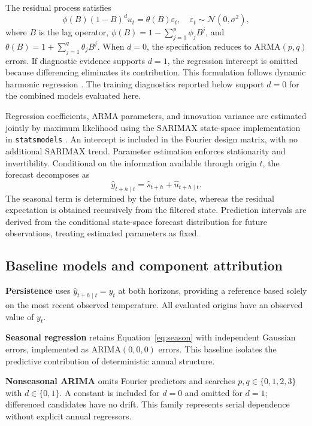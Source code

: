 \documentclass{article}
\begin{document}
The residual process satisfies
\begin{equation}
\phi(B)(1-B)^d u_t=\theta(B)\varepsilon_t,
\quad \varepsilon_t\sim\mathcal{N}(0,\sigma^2),
\end{equation}
where $B$ is the lag operator,
$\phi(B)=1-\sum_{j=1}^{p}\phi_jB^j$, and
$\theta(B)=1+\sum_{j=1}^{q}\theta_jB^j$.
When $d=0$, the specification reduces to ARMA$(p,q)$ errors. If diagnostic
evidence supports $d=1$, the regression intercept is omitted because
differencing eliminates its contribution. This formulation follows dynamic
harmonic regression \cite{hyndman2021}. The training diagnostics reported below
support $d=0$ for the combined models evaluated here.

Regression coefficients, ARMA parameters, and innovation variance are estimated
jointly by maximum likelihood using the SARIMAX state-space implementation
in \texttt{statsmodels} \cite{statsmodels}. An intercept is included in the
Fourier design matrix, with no additional SARIMAX trend. Parameter estimation
enforces stationarity and invertibility. Conditional on the information
available through origin $t$, the forecast decomposes as
\begin{equation}
\widehat y_{t+h\mid t}=\widehat s_{t+h}+\widehat u_{t+h\mid t}.
\end{equation}
The seasonal term is determined by the future date, whereas the residual
expectation is obtained recursively from the filtered state. Prediction
intervals are derived from the conditional state-space forecast distribution
for future observations, treating estimated parameters as fixed.

\subsection{Baseline models and component attribution}
\textbf{Persistence} uses $\widehat y_{t+h\mid t}=y_t$ at both horizons,
providing a reference based solely on the most recent observed temperature.
All evaluated origins have an observed value of $y_t$.

\textbf{Seasonal regression} retains Equation~\ref{eq:season} with independent
Gaussian errors, implemented as ARIMA$(0,0,0)$ errors. This baseline isolates
the predictive contribution of deterministic annual structure.

\textbf{Nonseasonal ARIMA} omits Fourier predictors and searches
$p,q\in\{0,1,2,3\}$ with $d\in\{0,1\}$. A constant is included for
$d=0$ and omitted for $d=1$; differenced candidates have no drift.
This family represents serial dependence without explicit annual regressors.
\end{document}
